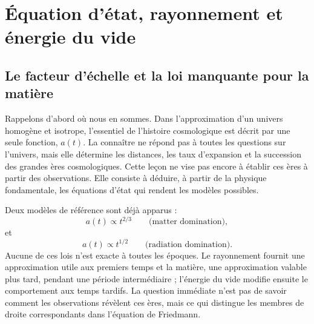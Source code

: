 \chapter{Équation d’état, rayonnement et énergie du vide}


\section{Le facteur d’échelle et la loi manquante pour la matière}

Rappelons d’abord où nous en sommes. Dans l’approximation d’un univers homogène et isotrope, l’essentiel de l’histoire cosmologique est décrit par une seule fonction, \(a(t)\). La connaître ne répond pas à toutes les questions sur l’univers, mais elle détermine les distances, les taux d’expansion et la succession des grandes ères cosmologiques. Cette leçon ne vise pas encore à établir ces ères à partir des observations. Elle consiste à déduire, à partir de la physique fondamentale, les équations d’état qui rendent les modèles possibles.

Deux modèles de référence sont déjà apparus :
\begin{equation}
a(t)\propto t^{2/3}
\qquad\text{(matter domination)},
\end{equation}
et
\begin{equation}
a(t)\propto t^{1/2}
\qquad\text{(radiation domination)}.
\end{equation}
Aucune de ces lois n’est exacte à toutes les époques. Le rayonnement fournit une approximation utile aux premiers temps et la matière, une approximation valable plus tard, pendant une période intermédiaire ; l’énergie du vide modifie ensuite le comportement aux temps tardifs. La question immédiate n’est pas de savoir comment les observations révèlent ces ères, mais ce qui distingue les membres de droite correspondants dans l’équation de Friedmann.

